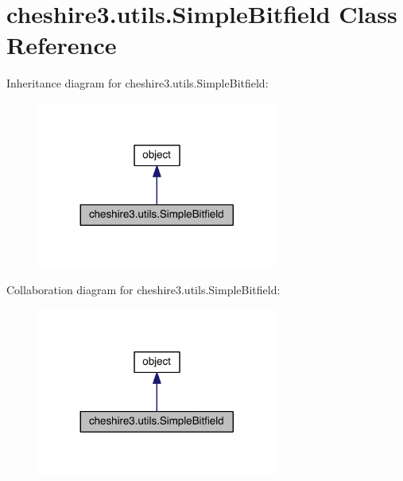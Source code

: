 \hypertarget{classcheshire3_1_1utils_1_1_simple_bitfield}{\section{cheshire3.\-utils.\-Simple\-Bitfield Class Reference}
\label{classcheshire3_1_1utils_1_1_simple_bitfield}
}


Inheritance diagram for cheshire3.\-utils.\-Simple\-Bitfield\-:
\nopagebreak
\begin{figure}[H]
\begin{center}
\leavevmode
\includegraphics[width=224pt]{classcheshire3_1_1utils_1_1_simple_bitfield__inherit__graph}
\end{center}
\end{figure}


Collaboration diagram for cheshire3.\-utils.\-Simple\-Bitfield\-:
\nopagebreak
\begin{figure}[H]
\begin{center}
\leavevmode
\includegraphics[width=224pt]{classcheshire3_1_1utils_1_1_simple_bitfield__coll__graph}
\end{center}
\end{figure}
